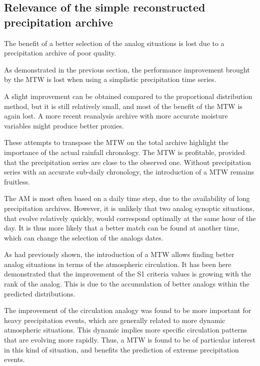 \documentclass[hess, manuscript]{copernicus}
\begin{document}
\subsection{Relevance of the simple reconstructed precipitation archive}

The benefit of a better selection of the analog situations is lost due to a precipitation archive of poor quality.


As demonstrated in the previous section, the performance improvement brought by the MTW is lost when using a simplistic precipitation time series.



A slight improvement can be obtained compared to the proportional distribution method, but it is still relatively small, and most of the benefit of the MTW is again lost. A more recent reanalysis archive with more accurate moisture variables might produce better proxies.

These attempts to transpose the MTW on the total archive highlight the importance of the actual rainfall chronology. The MTW is profitable, provided that the precipitation series are close to the observed one. Without precipitation series with an accurate sub-daily chronology, the introduction of a MTW remains fruitless.



\conclusions  %

The AM is most often based on a daily time step, due to the availability of long precipitation archives. However, it is unlikely that two analog synoptic situations, that evolve relatively quickly, would correspond optimally at the same hour of the day. It is thus more likely that a better match can be found at another time, which can change the selection of the analogs dates.

As \citet{Finet2008} had previously shown, the introduction of a MTW allows finding better analog situations in terms of the atmospheric circulation. It has been here demonstrated that the improvement of the S1 criteria values is growing with the rank of the analog. This is due to the accumulation of better analogs within the predicted distributions.

The improvement of the circulation analogy was found to be more important for heavy precipitation events, which are generally related to more dynamic atmospheric situations. This dynamic implies more specific circulation patterns that are evolving more rapidly. Thus, a MTW is found to be of particular interest in this kind of situation, and benefits the prediction of extreme precipitation events.
\end{document}
